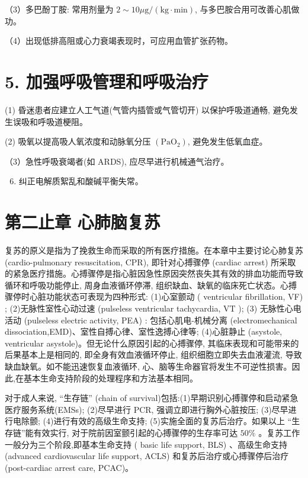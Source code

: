 \documentclass[10pt]{article}
\begin{document}
（3）多巴酚丁胺: 常用剂量为 $2 \sim 10 \mu \mathrm{g} /(\mathrm{kg} \cdot \mathrm{min})$, 与多巴胺合用可改善心肌做功。

（4）出现低排高阻或心力衰竭表现时，可应用血管扩张药物。

\section*{5. 加强呼吸管理和呼吸治疗}
(1) 昏迷患者应建立人工气道(气管内插管或气管切开) 以保护呼吸道通畅, 避免发生误吸和呼吸道梗阻。

(2) 吸氧以提高吸人氧浓度和动脉氧分压 $\left(\mathrm{PaO}_{2}\right)$, 避免发生低氧血症。

（3）急性呼吸衰竭者(如 ARDS), 应尽早进行机械通气治疗。

\begin{enumerate}
  \setcounter{enumi}{5}
  \item 纠正电解质絮乱和酸碱平衡失常。
\end{enumerate}

\section*{第二止章 心肺脑复苏}
复苏的原义是指为了挽救生命而采取的所有医疗措施。在本章中主要讨论心肺复苏 (cardio-pulmonary resuscitation, CPR), 即针对心搏骤停 (cardiac arrest) 所采取的紧急医疗措施。心搏骤停是指心脏因急性原因突然丧失其有效的排血功能而导致循环和呼吸功能停止, 周身血液循环停滞, 组织缺血、缺氧的临床死亡状态。心搏骤停时心脏功能状态可表现为四种形式: (1)心室颤动 ( ventricular fibrillation, VF) ; (2)无脉性室性心动过速 (pulseless ventricular tachycardia, $\mathrm{VT}$ ); (3) 无脉性心电活动 (pulseless electric activity, PEA) : 包括心肌电-机械分离 (electromechanical dissociation,EMD)、室性自搏心律、室性逸搏心律等; (4)心脏静止 (asystole, ventricular asystole)。但无论什么原因引起的心搏骤停, 其临床表现和可能带来的后果基本上是相同的, 即全身有效血液循环停止, 组织细胞立即失去血液灌流, 导致缺血缺氧。如不能迅速恢复血液循环, 心、脑等生命器官将发生不可逆性损害。因此,在基本生命支持阶段的处理程序和方法基本相同。

对于成人来说, “生存链” (chain of survival)包括:(1)早期识别心搏骤停和启动紧急医疗服务系统(EMSs); (2)尽早进行 PCR, 强调立即进行胸外心脏按压; (3)尽早进行电除颤; (4)进行有效的高级生命支持; (5)实施全面的复苏后治疗。如果以上 “生存链”能有效实行, 对于院前因室颤引起的心搏骤停的生存率可达 $50 \%$ 。复苏工作一般分为三个阶段,即基本生命支持 ( basic life support, BLS) 、高级生命支持 (advanced cardiovascular life support, ACLS) 和复苏后治疗或心搏骤停后治疗 (post-cardiac arrest care, PCAC)。
\end{document}
